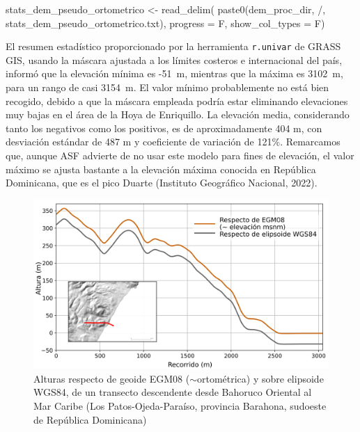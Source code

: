 \documentclass[spanish]{article}
\newenvironment{Shaded}{\begin{snugshade}}{\end{snugshade}}
\newcommand{\AttributeTok}[1]{\textcolor[rgb]{0.77,0.63,0.00}{#1}}
\newcommand{\FunctionTok}[1]{\textcolor[rgb]{0.00,0.00,0.00}{#1}}
\newcommand{\NormalTok}[1]{#1}
\newcommand{\OtherTok}[1]{\textcolor[rgb]{0.56,0.35,0.01}{#1}}
\newcommand{\StringTok}[1]{\textcolor[rgb]{0.31,0.60,0.02}{#1}}
\begin{document}
\begin{Shaded}
\begin{Highlighting}[]
\NormalTok{stats\_dem\_pseudo\_ortometrico }\OtherTok{\textless{}{-}} \FunctionTok{read\_delim}\NormalTok{(}
  \FunctionTok{paste0}\NormalTok{(dem\_proc\_dir, }\StringTok{\textquotesingle{}/\textquotesingle{}}\NormalTok{,}
         \StringTok{\textquotesingle{}stats\_dem\_pseudo\_ortometrico.txt\textquotesingle{}}\NormalTok{),}
  \AttributeTok{progress =}\NormalTok{ F, }\AttributeTok{show\_col\_types =}\NormalTok{ F)}
\end{Highlighting}
\end{Shaded}

El resumen estadístico proporcionado por la herramienta
\texttt{r.univar} de GRASS GIS, usando la máscara ajustada a los límites
costeros e internacional del país, informó que la elevación mínima es
-51~m, mientras que la máxima es 3102~m, para un rango de casi 3154~m.
El valor mínimo probablemente no está bien recogido, debido a que la
máscara empleada podría estar eliminando elevaciones muy bajas en el
área de la Hoya de Enriquillo. La elevación media, considerando tanto
los negativos como los positivos, es de aproximadamente 404 m, con
desviación estándar de 487 m y coeficiente de variación de 121\%.
Remarcamos que, aunque ASF advierte de no usar este modelo para fines de
elevación, el valor máximo se ajusta bastante a la elevación máxima
conocida en República Dominicana, que es el pico Duarte (Instituto
Geográfico Nacional, 2022).

\begin{figure}

{\centering \includegraphics[width=1\linewidth]{figuras/perfiles-dem/los-patos} 

}

\caption{Alturas respecto de geoide EGM08 ($\sim$ortométrica) y sobre elipsoide WGS84, de un transecto descendente desde Bahoruco Oriental al Mar Caribe (Los Patos-Ojeda-Paraíso, provincia Barahona, sudoeste de República Dominicana)}\label{fig:alturasgeoideelipsoide}
\end{figure}
\end{document}
